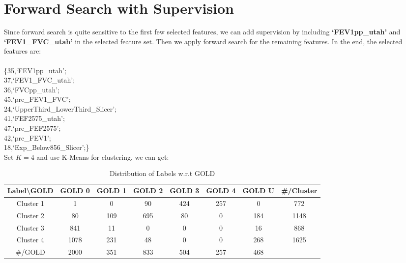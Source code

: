 \documentclass[11pt]{article}
\begin{document}
\section{Forward Search with Supervision}
Since forward search is quite sensitive to the first few selected features, we can add supervision by including \textbf{`FEV1pp\_utah'} and \textbf{`FEV1\_FVC\_utah'} in the selected feature set. Then we apply forward search for the remaining features. In the end, the selected features are:\\
\\
\{35,`FEV1pp\_utah';\\
37,`FEV1\_FVC\_utah';\\
36,`FVCpp\_utah';\\
45,`pre\_FEV1\_FVC';\\
24,`UpperThird\_LowerThird\_Slicer';\\
41,`FEF2575\_utah';\\
47,`pre\_FEF2575';\\
42,`pre\_FEV1';\\
18,`Exp\_Below856\_Slicer';\}\\
Set $K=4$ and use K-Means for clustering, we can get:\\
\begin{table}[ht]
\caption{Distribution of Labels w.r.t GOLD}
\centering
\begin{tabular}{c c c c c c c|c}
\hline\hline
Label\textbackslash GOLD & GOLD 0 & GOLD 1 & GOLD 2 & GOLD 3 & GOLD 4 & GOLD U & \#/Cluster\\[1ex]
\hline
Cluster 1 & 1 & 0 & 90 & 424 & 257 & 0 & 772\\
Cluster 2 & 80 & 109 & 695 & 80 & 0 & 184 & 1148\\
Cluster 3 & 841 & 11 & 0 & 0 & 0 & 16 & 868\\
Cluster 4 & 1078 & 231 & 48 & 0 & 0 & 268 & 1625\\
\hline
\#/GOLD & 2000 & 351 & 833 & 504 & 257 & 468\\[1ex]
\hline
\end{tabular}
\label{table:dist_cluster_labels_gold_3}
\end{table}
\end{document}

